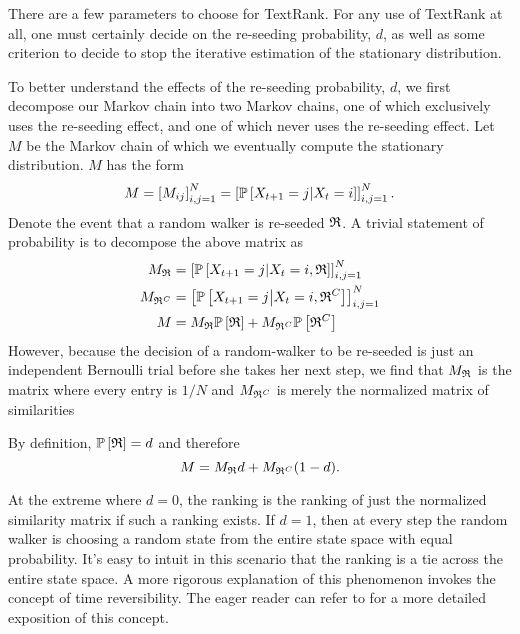 There are a few parameters to choose for TextRank.
For any use of TextRank at all, one must certainly decide on the re-seeding probability, $d$, as well as some criterion to decide to stop the iterative estimation of the stationary distribution.

To better understand the effects of the re-seeding probability, $d$, we first decompose our Markov chain into two Markov chains, one of which exclusively uses the re-seeding effect, and one of which never uses the re-seeding effect.
Let $M$ be the Markov chain of which we eventually compute the stationary distribution.
$M$ has the form
\begin{equation*}
  M = \left[ M_{ij} \right]_{i,j=1}^N = \left[ \mathbb{P} \left[ X_{t+1} = j \middle| X_t = i \right] \right]_{i,j=1}^N.
\end{equation*}
Denote the event that a random walker is re-seeded $\frak{R}$. 
A trivial statement of probability is to decompose the above matrix as
\begin{equation*}
  \begin{aligned}
    M_{\frak{R}} &= \left[ \mathbb{P} \left[ X_{t+1} = j \middle| X_t = i, \frak{R} \right] \right]_{i,j=1}^N \\
    M_{\frak{R}^C} &= \left[ \mathbb{P} \left[ X_{t+1} = j \middle| X_t = i, \frak{R}^C \right] \right]_{i,j=1}^N \\
    M &=  M_{\frak{R}} \mathbb{P} \left[ \frak{R} \right]  +  M_{\frak{R}^C} \mathbb{P} \left[ \frak{R}^C \right]     
  \end{aligned}
\end{equation*}
However, because the decision of a random-walker to be re-seeded is just an independent Bernoulli trial before she takes her next step, we find that $M_{\frak{R}}$ is the matrix where every entry is $1/N$ and $M_{\frak{R}^C}$ is merely the normalized matrix of similarities

By definition, $\mathbb{P} \left[ \frak{R} \right] = d$ and therefore
\begin{equation*}
  M =  M_{\frak{R}} d  +  M_{\frak{R}^C} (1-d).
\end{equation*}

At the extreme where $d=0$, the ranking is the ranking of just the normalized similarity matrix if such a ranking exists.
If $d=1$, then at every step the random walker is choosing a random state from the entire state space with equal probability.
It's easy to intuit in this scenario that the ranking is a tie across the entire state space.
A more rigorous explanation of this phenomenon invokes the concept of time reversibility. 
The eager reader can refer to \cite{intro-prob-models-ross} for a more detailed exposition of this concept.

